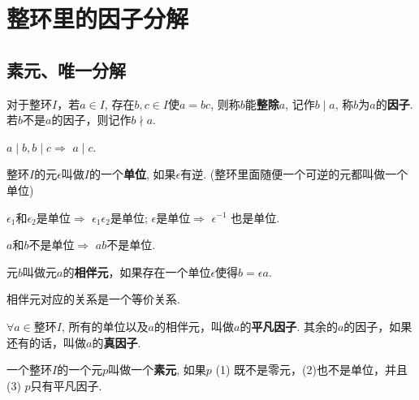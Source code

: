 \section{整环里的因子分解}

\subsection{素元、唯一分解}

\begin{Definition}[!整除]
对于整环$I$，若$a \in I$, 存在$b, c \in I$使$a=bc$, 则称$b$能\textbf{整除}$a$, 记作$b \mid a$, 称$b$为$a$的\textbf{因子}. 若$b$不是$a$的因子，则记作$b \nmid a$.
\end{Definition}

\begin{Proposition}[整除具有传递性]
$a \mid b, b \mid c \Rightarrow$ $a \mid c$.
\end{Proposition}

\begin{Definition}[单位]
整环$I$的元$\epsilon$叫做$I$的一个\textbf{单位}, 如果$\epsilon$有逆. (整环里面随便一个可逆的元都叫做一个单位)
\end{Definition}


\begin{Theorem}
$\epsilon_1$和$\epsilon_2$是单位$\Rightarrow$ $\epsilon_1 \epsilon_2$是单位; $\epsilon$是单位$\Rightarrow$ $\epsilon^{-1}$ 也是单位.
\end{Theorem}

\begin{Proposition}
$a$和$b$不是单位$\Rightarrow$ $a b$不是单位.
\end{Proposition}

\begin{Definition}[相伴元]
元$b$叫做元$a$的\textbf{相伴元}，如果存在一个单位$\epsilon$使得$b = \epsilon a$.
\end{Definition}

\begin{Note}
相伴元对应的关系是一个等价关系.
\end{Note}

\begin{Definition}
$\forall a \in $整环$I$, 所有的单位以及$a$的相伴元，叫做$a$的\textbf{平凡因子}. 其余的$a$的因子，如果还有的话，叫做$a$的\textbf{真因子}.
\end{Definition}

\begin{Definition}[素元]
一个整环$I$的一个元$p$叫做一个\textbf{素元}, 如果$p$ (1) 既不是零元，(2)也不是单位，并且 (3) $p$只有平凡因子.
\end{Definition}

